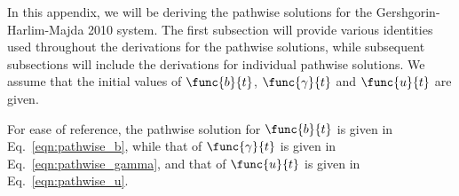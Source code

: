 In this appendix, we will be deriving the pathwise solutions for the Gershgorin-Harlim-Majda 2010 system. The first subsection will provide various identities used throughout the derivations for the pathwise solutions, while subsequent subsections will include the derivations for individual pathwise solutions. We assume that the initial values of $\func{b}{t}$, $\func{\gamma}{t}$ and $\func{u}{t}$ are given.

For ease of reference, the pathwise solution for $\func{b}{t}$ is given in Eq.~\ref{eqn:pathwise_b}, while that of $\func{\gamma}{t}$ is given in Eq.~\ref{eqn:pathwise_gamma}, and that of $\func{u}{t}$ is given in Eq.~\ref{eqn:pathwise_u}.